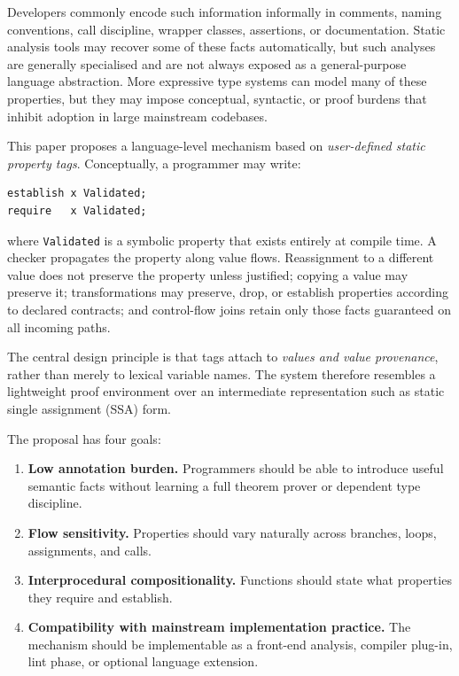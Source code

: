 \documentclass[11pt]{article}
\begin{document}
Developers commonly encode such information informally in comments, naming conventions, call discipline, wrapper classes, assertions, or documentation. Static analysis tools may recover some of these facts automatically, but such analyses are generally specialised and are not always exposed as a general-purpose language abstraction. More expressive type systems can model many of these properties, but they may impose conceptual, syntactic, or proof burdens that inhibit adoption in large mainstream codebases.

This paper proposes a language-level mechanism based on \emph{user-defined static property tags}. Conceptually, a programmer may write:

\begin{lstlisting}
establish x Validated;
require   x Validated;
\end{lstlisting}

where \texttt{Validated} is a symbolic property that exists entirely at compile time. A checker propagates the property along value flows. Reassignment to a different value does not preserve the property unless justified; copying a value may preserve it; transformations may preserve, drop, or establish properties according to declared contracts; and control-flow joins retain only those facts guaranteed on all incoming paths.

The central design principle is that tags attach to \emph{values and value provenance}, rather than merely to lexical variable names. The system therefore resembles a lightweight proof environment over an intermediate representation such as static single assignment (SSA) form.

The proposal has four goals:
\begin{enumerate}[label=\arabic*.]
  \item \textbf{Low annotation burden.} Programmers should be able to introduce useful semantic facts without learning a full theorem prover or dependent type discipline.
  \item \textbf{Flow sensitivity.} Properties should vary naturally across branches, loops, assignments, and calls.
  \item \textbf{Interprocedural compositionality.} Functions should state what properties they require and establish.
  \item \textbf{Compatibility with mainstream implementation practice.} The mechanism should be implementable as a front-end analysis, compiler plug-in, lint phase, or optional language extension.
\end{enumerate}
\end{document}
